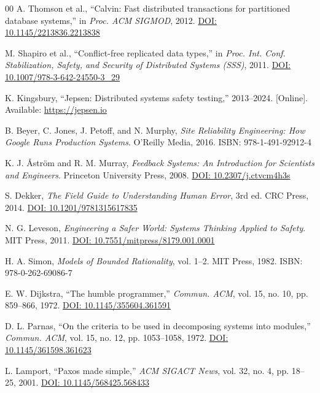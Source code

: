 \documentclass[conference]{IEEEtran}
\begin{document}
{\begin{thebibliography}{00}
A. Thomson et al., ``Calvin: Fast distributed transactions for partitioned database systems,'' in \textit{Proc. ACM SIGMOD}, 2012.
\href{https://doi.org/10.1145/2213836.2213838}{DOI: 10.1145/2213836.2213838}

M. Shapiro et al., ``Conflict-free replicated data types,'' in \textit{Proc. Int. Conf. Stabilization, Safety, and Security of Distributed Systems (SSS)}, 2011.
\href{https://doi.org/10.1007/978-3-642-24550-3_29}{DOI: 10.1007/978-3-642-24550-3\_29}

K. Kingsbury, ``Jepsen: Distributed systems safety testing,'' 2013--2024. [Online]. Available: \url{https://jepsen.io}

B. Beyer, C. Jones, J. Petoff, and N. Murphy, \textit{Site Reliability Engineering: How Google Runs Production Systems}. O'Reilly Media, 2016.
ISBN: 978-1-491-92912-4

K. J. \AA{}str\"om and R. M. Murray, \textit{Feedback Systems: An Introduction for Scientists and Engineers}. Princeton University Press, 2008.
\href{https://doi.org/10.2307/j.ctvcm4h3s}{DOI: 10.2307/j.ctvcm4h3s}

S. Dekker, \textit{The Field Guide to Understanding Human Error}, 3rd ed. CRC Press, 2014.
\href{https://doi.org/10.1201/9781315617835}{DOI: 10.1201/9781315617835}

N. G. Leveson, \textit{Engineering a Safer World: Systems Thinking Applied to Safety}. MIT Press, 2011.
\href{https://doi.org/10.7551/mitpress/8179.001.0001}{DOI: 10.7551/mitpress/8179.001.0001}

H. A. Simon, \textit{Models of Bounded Rationality}, vol. 1--2. MIT Press, 1982.
ISBN: 978-0-262-69086-7

E. W. Dijkstra, ``The humble programmer,'' \textit{Commun. ACM}, vol. 15, no. 10, pp. 859--866, 1972.
\href{https://doi.org/10.1145/355604.361591}{DOI: 10.1145/355604.361591}

D. L. Parnas, ``On the criteria to be used in decomposing systems into modules,'' \textit{Commun. ACM}, vol. 15, no. 12, pp. 1053--1058, 1972.
\href{https://doi.org/10.1145/361598.361623}{DOI: 10.1145/361598.361623}

L. Lamport, ``Paxos made simple,'' \textit{ACM SIGACT News}, vol. 32, no. 4, pp. 18--25, 2001.
\href{https://doi.org/10.1145/568425.568433}{DOI: 10.1145/568425.568433}


\end{thebibliography}}
\end{document}
